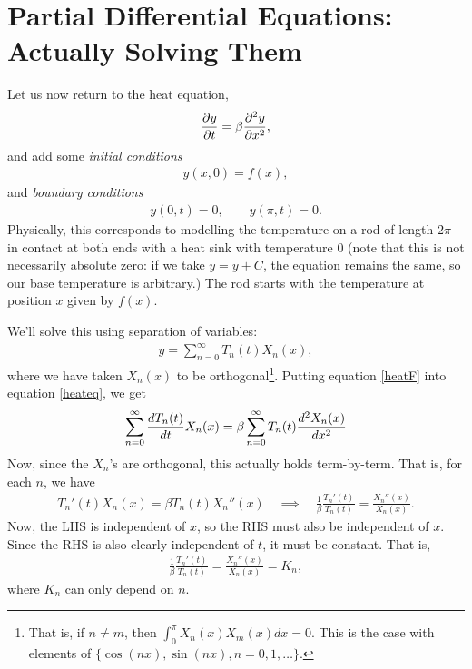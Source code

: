 \documentclass{book}
\begin{document}
\chapter{Partial Differential Equations:
         \\Actually Solving Them}

Let us now return to the heat equation,
\begin{align}
\label{heateq}
\frac{\partial y}{\partial t} = \beta \frac{\partial^2y}{\partial x^2},
\end{align}
and add some \emph{initial conditions}
\begin{align*}
y(x,0)=f(x),
\end{align*}
and \emph{boundary conditions}
\begin{align}
\label{homdibc}
y(0,t)=0, \qquad y(\pi,t)=0.
\end{align}
Physically, this corresponds to modelling the temperature on a rod of length
$2\pi$ in contact at both ends with a heat sink with temperature $0$ (note
that this is not necessarily absolute zero: if we take $y=y+C$, the equation
remains the same, so our base temperature is arbitrary.) The
rod starts with the temperature at position $x$ given by $f(x)$.

We'll solve this using separation of variables:
\begin{align}\label{heatF}
y = \sum_{n=0}^\infty T_n(t) X_n(x),
\end{align}
where we have taken $X_n(x)$ to be orthogonal\footnote{That is, if $n\neq m$,
then $\int_0^\pi X_n(x) X_m(x) dx =0.$ This is the case with elements of
$\{\cos(nx),\sin(nx),n=0,1,\dots \}$.}.
Putting equation \eqref{heatF} into equation \eqref{heateq}, we get
\begin{align}\label{heats}
\sum_{n=0}^\infty \frac{d T_n(t)}{d t}X_n(x)
=\beta\sum_{n=0}^\infty T_n(t)\frac{d^2 X_n(x)}{d x^2}
\end{align}
Now, since the $X_n$'s are orthogonal, this actually holds term-by-term. That
is, for each $n$, we have
\begin{align*}
T_n'(t)X_n(x) = \beta  T_n(t)X_n''(x)
\quad \implies \quad
\frac{1}{\beta}\frac{T_n'(t)}{T_n(t)}= \frac{X_n''(x)}{X_n(x)}.
\end{align*}
Now, the LHS is independent of $x$, so the RHS must also be independent of $x$.
Since the RHS is also clearly independent of $t$, it must be constant. That is,
\begin{align*}
\frac{1}{\beta}\frac{T_n'(t)}{T_n(t)}= \frac{X_n''(x)}{X_n(x)} = K_n,
\end{align*}
where $K_n$ can only depend on $n$.
\end{document}
